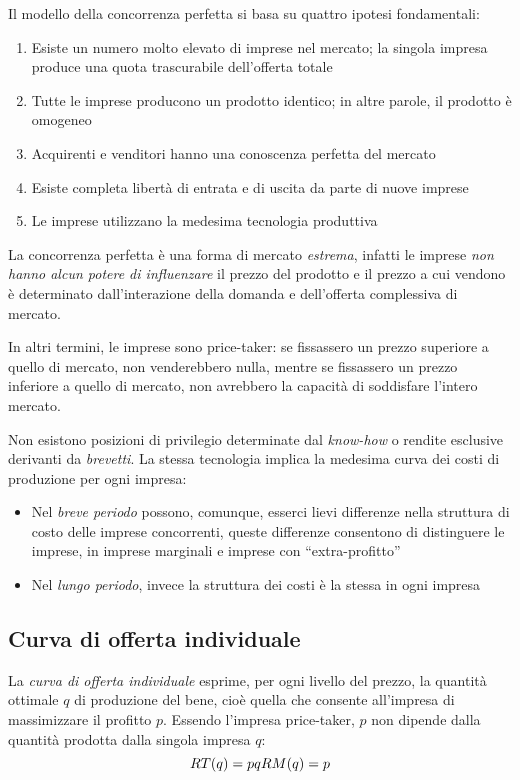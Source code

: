 Il modello della concorrenza perfetta si basa su quattro ipotesi fondamentali:
\begin{enumerate}
	\item Esiste un numero molto elevato di imprese nel mercato; la singola impresa produce una quota
	trascurabile dell’offerta totale
	\item Tutte le imprese producono un prodotto identico; in altre parole, il prodotto è omogeneo
	\item Acquirenti e venditori hanno una conoscenza perfetta del mercato
	\item Esiste completa libertà di entrata e di uscita da parte di nuove imprese
	\item Le imprese utilizzano la medesima tecnologia produttiva
\end{enumerate}

La concorrenza perfetta è una forma di mercato \emph{estrema}, infatti le imprese \emph{non hanno alcun potere di influenzare} il prezzo del prodotto e il prezzo a cui vendono è determinato dall’interazione della domanda e dell’offerta complessiva di
mercato.

In altri termini, le imprese sono price-taker: se fissassero un prezzo superiore a quello di mercato, non venderebbero nulla, mentre se fissassero un prezzo inferiore a quello di mercato, non avrebbero la capacità di soddisfare
l’intero mercato.

Non esistono
posizioni di privilegio determinate dal \emph{know-how} o rendite esclusive derivanti da \emph{brevetti}. La stessa
tecnologia implica la medesima curva dei costi di produzione per ogni impresa:
\begin{itemize}
	\item Nel \emph{breve periodo} possono, comunque, esserci lievi differenze nella struttura di costo delle
	imprese concorrenti, queste differenze consentono di distinguere le imprese, in imprese
	marginali e imprese con ``extra-profitto''
	\item Nel \emph{lungo periodo}, invece la struttura dei costi è la stessa in ogni impresa
\end{itemize}

\subsection{Curva di offerta individuale}
La \emph{curva di offerta individuale} esprime, per ogni livello del prezzo, la quantità ottimale $q$ di produzione
del bene, cioè quella che consente all’impresa di massimizzare il profitto $p$.
Essendo l’impresa price-taker, $p$ non dipende dalla quantità prodotta dalla singola impresa $q$:
\[
RT(q) = pq \\ RM(q) = p
\]

